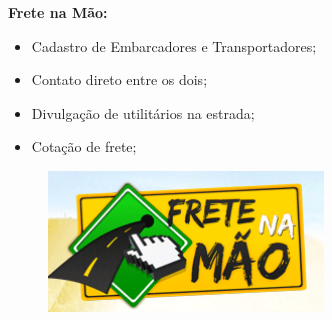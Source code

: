             
            
            
		\begin{minipage}{0.48\textwidth}
			
			\textbf{Frete na Mão:}
				\begin{itemize}
					\item Cadastro de Embarcadores e Transportadores;
					\item Contato direto entre os dois;
					\item Divulgação de utilitários na estrada;
					\item Cotação de frete;
				\end{itemize}
                
		\end{minipage}
		\begin{minipage}{0.48\textwidth}
			
			\begin{figure}[H]
				\centering
				\includegraphics[width=0.65\textwidth]{img/frete-na-mao.png}
			\end{figure}
			
		\end{minipage}
        \bigskip
                
                
            
